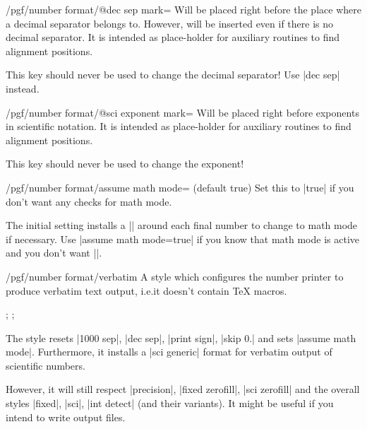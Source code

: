\begin{key}{/pgf/number format/@dec sep mark=}
    Will be placed right before the place where a decimal separator belongs to.
    However,  will be inserted even if there is no decimal
    separator. It is intended as place-holder for auxiliary routines to find
    alignment positions.

    This key should never be used to change the decimal separator! Use
    |dec sep| instead.
\end{key}

\begin{key}{/pgf/number format/@sci exponent mark=}
    Will be placed right before exponents in scientific notation. It is
    intended as place-holder for auxiliary routines to find alignment
    positions.

    This key should never be used to change the exponent!
\end{key}

\begin{key}{/pgf/number format/assume math mode= (default true)}
    Set this to |true| if you don't want any checks for math mode.

    The initial setting installs a |\pgfutilensuremath| around each final
    number to change to math mode if necessary. Use |assume math mode=true| if
    you know that math mode is active and you don't want |\pgfutilensuremath|.
\end{key}

\begin{stylekey}{/pgf/number format/verbatim}
    A style which configures the number printer to produce verbatim text
    output, i.e.\@ it doesn't contain \TeX{} macros.
\begin{codeexample}[pre={\begin{lateximage}},post={\end{lateximage}}]
;
;
\pgfmathprintnumber{\pgfmathresult}
\end{codeexample}
    The style resets |1000 sep|, |dec sep|, |print sign|, |skip 0.| and sets
    |assume math mode|. Furthermore, it installs a |sci generic| format for
    verbatim output of scientific numbers.

    However, it will still respect |precision|, |fixed zerofill|,
    |sci zerofill| and the overall styles |fixed|, |sci|, |int detect| (and
    their variants). It might be useful if you intend to write output files.
\end{stylekey}


